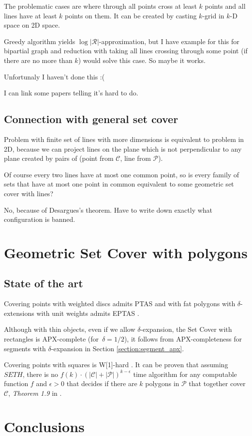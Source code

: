\documentclass[en]{pracamgr}
\newcommand{\points}{\mathcal{C}}
\newcommand{\sets}{\mathcal{P}}
\begin{document}
The problematic cases are where through all points
cross at least $k$ points and all lines have at least $k$ points on them.
It can be created by casting $k$-grid in $k$-D space on 2D space.

Greedy algorithm yields $\log |\mathcal{R}|$-approximation,
but I have example for this for bipartial graph and
reduction with taking all lines crossing through some point
(if there are no more than $k$) would solve this case.
So maybe it works.

Unfortunaly I haven't done this :(

I can link some papers telling it's hard to do.

\section{Connection with general set cover}
Problem with finite set of lines with more dimensions
is equivalent
to problem in 2D, because we can project
lines on the plane which is not perpendicular
to any plane created by pairs of
(point from $\mathcal{C}$, line from $\mathcal{P}$).

Of course every two lines have at most one common point,
so is every family of sets that have at most one point
in common equivalent to some geometric set cover with lines?

No, because of Desargues's theorem.
Have to write down exactly what configuration is banned.


\chapter{Geometric Set Cover with polygons}
\section{State of the art}

Covering points with weighted discs admits PTAS \cite{li}
and with fat polygons with $\delta$-extensions with unit weights
admits EPTAS \cite{harpeled12}.

Although with thin objects, even if we allow $\delta$-expansion,
the Set Cover with rectangles
is APX-complete (for~$\delta = 1/2$),
it follows from APX-completeness for segments with $\delta$-expansion
in Section \ref{section:segment_apx}.

Covering points with squares is W[1]-hard \cite{marx05}.
It can be proven that assuming $SETH$,
there is no $f(k)\cdot(|\points|+|\sets|)^{k-\epsilon}$ time algorithm
for any computable function $f$ and $\epsilon >0$ that decides if there
are $k$ polygons in $\sets$ that together cover $\points$,
\textit{Theorem 1.9} in \cite{voronoi}.









\chapter{Conclusions}




\end{document}
